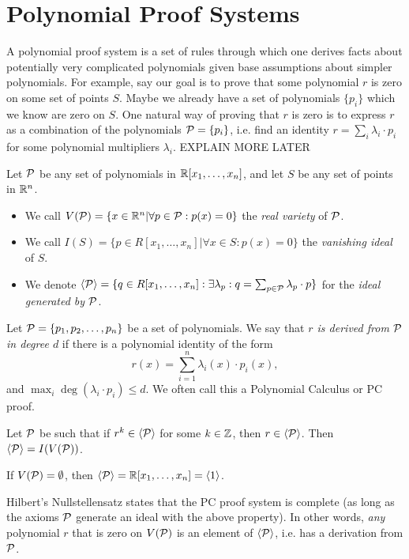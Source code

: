 \section{Polynomial Proof Systems}
A polynomial proof system is a set of rules through which one derives facts about potentially very complicated polynomials given base assumptions about simpler polynomials. For example, say our goal is to prove that some polynomial $r$ is zero on some set of points $S$. Maybe we already have a set of polynomials $\{p_i\}$ which we know are zero on $S$. One natural way of proving that $r$ is zero is to express $r$ as a combination of the polynomials $\mathcal P = \{p_i\}$, i.e. find an identity $r = \sum_i \lambda_i \cdot p_i$ for some polynomial multipliers $\lambda_i$. EXPLAIN MORE LATER
\begin{definition}
Let $\mathcal P$ be any set of polynomials in $\mathbb R[x_1,\dots,x_n]$, and let $S$ be any set of points in $\mathbb R^n$.
\begin{itemize}
\item We call $V(\mathcal P) = \{x \in \mathbb R^n | \forall p \in \mathcal P: p(x) = 0\}$ the \emph{real variety} of $\mathcal P$. 
\item We call $I(S) = \{p \in R[x_1,\dots,x_n] | \forall x \in S: p(x) = 0\}$ the \emph{vanishing ideal} of $S$.
\item We denote $\langle \mathcal P \rangle = \{q \in R[x_1,\dots,x_n]: \exists \lambda_p: q = \sum_{p \in \mathcal P} \lambda_p \cdot p\}$ for the \emph{ideal generated by $\mathcal P$}.
\end{itemize}
\end{definition}

\begin{definition}
Let $\mathcal P = \{p_1, p_2, \dots, p_n\}$ be a set of polynomials. We say that \emph{$r$ is derived from $\mathcal P$ in degree $d$} if there is a polynomial identity of the form
\[r(x) = \sum_{i=1}^n \lambda_i(x) \cdot p_i(x),\]
and $\max_i \deg(\lambda_i \cdot p_i) \leq d$. We often call this a Polynomial Calculus or PC proof.
\end{definition}
\begin{theorem}
Let $\mathcal P$ be such that if $r^k \in \langle \mathcal P \rangle$ for some $k \in \mathbb Z$, then $r \in \langle \mathcal P \rangle$. Then $\langle \mathcal P \rangle = I(V(\mathcal P))$.
\end{theorem}
\begin{corollary}
If $V(\mathcal P) = \emptyset$, then $\langle \mathcal P \rangle = \mathbb R[x_1,\dots,x_n] = \langle 1 \rangle$.
\end{corollary}
Hilbert's Nullstellensatz states that the PC proof system is complete (as long as the axioms $\mathcal P$ generate an ideal with the above property). In other words, \emph{any} polynomial $r$ that is zero on $V(\mathcal P)$ is an element of $\langle \mathcal P \rangle$, i.e. has a derivation from $\mathcal P$. 


